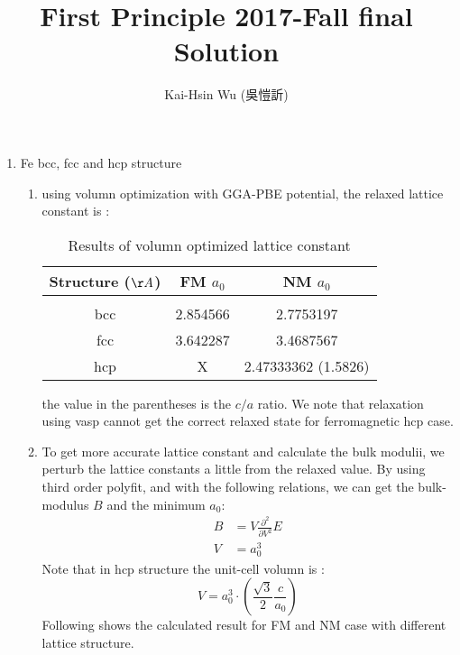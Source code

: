 \documentclass[notitlepage]{revtex4-1}
\begin{document}
\begin{CJK}{UTF8}{bsmi}
\title{First Principle 2017-Fall final Solution}
\author{Kai-Hsin Wu (吳愷訢)}

\maketitle

\begin{enumerate}
	
	\item Fe bcc, fcc and hcp structure
	\begin{enumerate}[label=(\alph*)]
		\item using volumn optimization with GGA-PBE potential, the relaxed lattice constant is :
		
		\begin{table}[h!]
			\centering
			\begin{tabular}{||c c c||} 
				\hline
				Structure ($\AA$) & FM $a_0$ & NM $a_0$ \\ [0.5ex] 
				\hline
				&&\\
				bcc        & 2.854566  & 2.7753197 \\
				fcc        & 3.642287  & 3.4687567 \\
				hcp        &  X        & 2.47333362 (1.5826) \\ [1ex] 
				\hline
			\end{tabular}
			\caption{Results of volumn optimized lattice constant}
			\label{table:1}
		\end{table}

		the value in the parentheses is the $c/a$ ratio. We note that relaxation using vasp cannot get the correct relaxed state for ferromagnetic hcp case.  
		
		\item To get more accurate lattice constant and calculate the bulk modulii, we perturb the lattice constants a little from the relaxed value. By using third order polyfit, and with the following relations, we can get the bulk-modulus $B$ and the minimum $a_0$:
		 \begin{align*}
	 	 B &= V\frac{\partial^2}{\partial V^2} E \\
		 V &= a_0^{3}
		 \end{align*}
		 Note that in hcp structure the unit-cell volumn is :
		 \begin{equation}
		 	V = a_0^{3} \cdot (\frac{\sqrt{3}}{2} \frac{c}{a_0})
		 \end{equation}
		 Following shows the calculated result for FM and NM case with different lattice structure. 
		 

\end{enumerate}
\end{enumerate}
\end{CJK}
\end{document}
